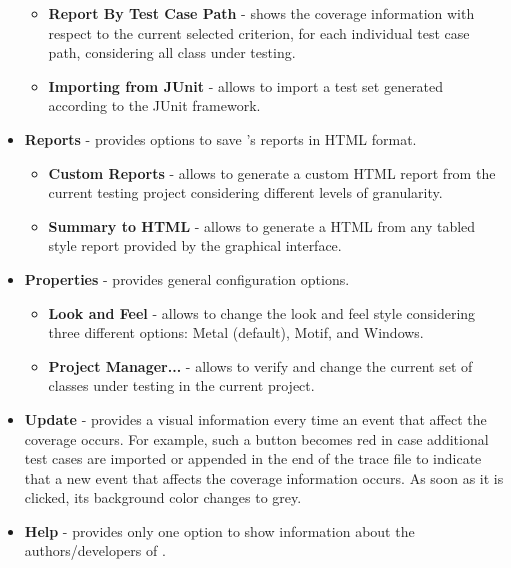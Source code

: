 \begin{itemize}
\begin{itemize}
            \item \textbf{Report By Test Case Path} - shows the coverage
            information with respect to the current selected criterion,
            for each individual test case path, considering all class under
            testing.

            \item \textbf{Importing from JUnit} - allows to import a test set
            generated according to the JUnit framework.
        \end{itemize}

    \item \textbf{Reports} - provides options to save \toolname's reports in
    HTML format.
        \begin{itemize}
            \item \textbf{Custom Reports} - allows to generate a custom
            HTML report from the current testing project considering different
            levels of granularity.

            \item \textbf{Summary to HTML} - allows to generate a HTML from
            any tabled style report provided by the \toolname graphical interface.
        \end{itemize}

    \item \textbf{Properties} - provides general configuration options.
        \begin{itemize}
            \item \textbf{Look and Feel} - allows to change the
            look and feel style considering three different options:
            Metal (default), Motif, and Windows.

            \item \textbf{Project Manager...} - allows to verify and change
            the current set of classes under testing in the current project.
        \end{itemize}

    \item \textbf{Update} - provides a visual information every time an
    event that affect the coverage occurs. For example, such a button becomes
    red in case additional test cases are imported or appended in the end of the
    trace file to indicate that a new event that affects the coverage information
    occurs. As soon as it is clicked, its background color changes
    to grey.

    \item \textbf{Help} - provides only one option to show information
    about the authors/developers of \toolname.
\end{itemize}

